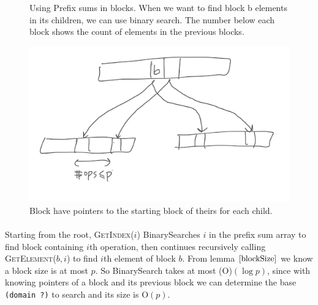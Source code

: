 \documentclass[10pt]{article}
\theoremstyle{definition}
\begin{document}
\begin{figure}
\begin{center}
\end{center}
\caption{\label{fig:prefix} Using Prefix sums in blocks. When we want to find block b elements in its children, we can use binary search. The number below each block shows the count of elements in the previous blocks.}
\end{figure}

\begin{figure}[hbt]
\centering
  \includegraphics[width=5in]{pics/pointers}
  \caption{Block have pointers to the starting block of theirs for each child. \label{fig::pointer}}
\end{figure}


\paragraph{}
Starting from the root, \textsc{GetIndex}($i$) BinarySearches $i$ in the prefix sum array to find block containing $i$th operation, then continues recursively calling \textsc{GetElement}($b,i$) to find $i$th element of block $b$. From lemma $\ref{blockSize}$ we know a block size is at most $p$. So BinarySearch takes at most \textsc(O)$(\log p)$, since  with knowing pointers of a block and its previous block we can determine the base \texttt{(domain ?)} to search and its size is \textsc{O}$(p)$.
\end{document}
